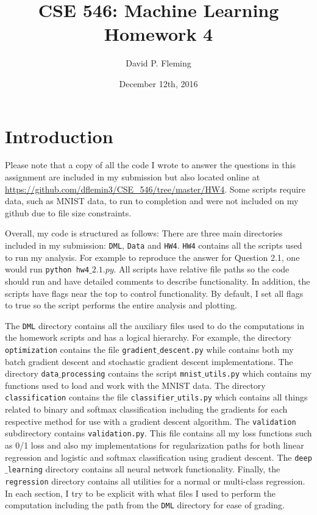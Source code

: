 \documentclass[12pt]{amsart}
\title{CSE 546: Machine Learning Homework 4}
\author{David P. Fleming}
\date{December 12th, 2016}
\begin{document}
\maketitle
\tableofcontents

\section*{Introduction}

Please note that a copy of all the code I wrote to answer the questions in this assignment are included in my submission but also located online at \url{https://github.com/dflemin3/CSE_546/tree/master/HW4}.  Some scripts require data, such as MNIST data, to run to completion and were not included on my github due to file size constraints.  

Overall, my code is structured as follows:  There are three main directories included in my submission: {\tt DML}, {\tt Data} and {\tt HW4}. {\tt HW4} contains all the scripts used to run my analysis.  For example to reproduce the answer for Question 2.1, one would run {\tt python hw4$\_2.1.py$}.  All scripts have relative file paths so the code should run and have detailed comments to describe functionality.  In addition, the scripts have flags near the top to control functionality.  By default, I set all flags to true so the script performs the entire analysis and plotting.  

The {\tt DML} directory contains all the auxiliary files used to do the computations in the homework scripts and has a logical hierarchy.  For example, the directory {\tt optimization} contains the file {\tt gradient$\_$descent.py} while contains both my batch gradient descent and stochastic gradient descent implementations.  The directory {\tt data$\_$processing} contains the script {\tt mnist$\_$utils.py} which contains my functions used to load and work with the MNIST data.  The directory {\tt classification} contains the file {\tt classifier$\_$utils.py} which contains all things related to binary and softmax classification including the gradients for each respective method for use with a gradient descent algorithm.  The {\tt validation} subdirectory contains {\tt validation.py}.  This file contains all my loss functions such as 0/1 loss and also my implementations for regularization paths for both linear regression and logistic and softmax classification using gradient descent.  The {\tt deep$\_$learning} directory contains all neural network functionality.  Finally, the {\tt regression} directory contains all utilities for a normal or multi-class regression.  In each section, I try to be explicit with what files I used to perform the computation including the path from the {\tt DML} directory for ease of grading.
\end{document}
